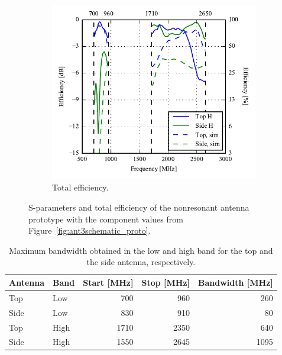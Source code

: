 \begin{figure}[htbp]
\begin{subfigure}{0.49\linewidth}
    \includegraphics{img/tech_sol/nonresonant/prototype/eff_comp.pdf}
        \caption{Total efficiency.}
    \end{subfigure}
    \caption{S-parameters and total efficiency of the nonresonant antenna prototype with the component values from Figure~\ref{fig:ant3schematic_proto}.}
    \label{fig:nonresonant_proto_sparam_eff}
\end{figure}

   \begin{table}
      \centering
      \begin{tabular}{|l|l|r|r|r|}
        \hline
        Antenna & Band & Start [MHz] & Stop [MHz] & Bandwidth [MHz] \\
        \hline
        Top     & Low  & 700        & 960       & 260 \\
        Side    & Low  & 830         & 910        & 80 \\
        \hline
        Top     & High & 1710        & 2350       & 640 \\
        Side    & High & 1550        & 2645       & 1095 \\
        \hline
      \end{tabular}
      \caption{Maximum bandwidth obtained in the low and high band for the top and the side antenna, respectively.}
      \label{tab:bw_sol3_proto}
    \end{table}

